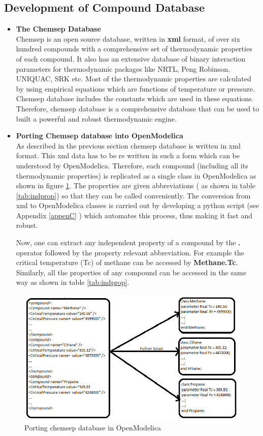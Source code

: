 \documentclass[12pt]{report}
\begin{document}
\subsection{Development of Compound Database}
\begin{itemize}
\item {\textbf{The Chemsep Database}} \\
Chemsep is an open source database, written in \textbf{xml} format, of over six hundred compounds with a comprehensive set of thermodynamic properties of each compound. It also has an extensive database of binary interaction parameters for thermodynamic packages like NRTL, Peng Robinson, UNIQUAC, SRK etc. Most of the thermodynamic properties are calculated by using empirical equations which are functions of temperature or pressure. Chemsep database includes the constants which are used in these equations. Therefore, chemsep database is a comprehensive database that can be used to built a powerful and robust thermodynamic engine.

\item{\textbf{Porting Chemsep database into OpenModelica}} \\
As described in the previous section chemsep database is written in xml format. This xml data has to be re written in such a form which can be understood by OpenModelica. Therefore, each compound (including all its thermodynamic properties) is replicated as a single class in OpenModelica as shown in figure \ref{fig:BT1}. The properties are given abbreviations ( as shown in table \ref{tab:indprop}) so that they can be called conveniently. The conversion from xml to OpenModelica classes is carried out by developing a python script (see Appendix \ref{appenC} ) which automates this process, thus making it fast and robust. 

Now, one can extract any independent property of a compound by the \textbf{.} operator followed by the property relevant abbreviation. For example the critical temperature (Tc) of methane can be accessed by \textbf{Methane.Tc}. Similarly, all the properties of any compound can be accessed in the same way as shown in table \ref{tab:indprop}. \\
\end{itemize}

\begin{figure}
\centering
\includegraphics[width=0.8\linewidth]{BT1}
\caption{Porting chemsep database in OpenModelica}
\label{fig:BT1}
\end{figure}
\end{document}
